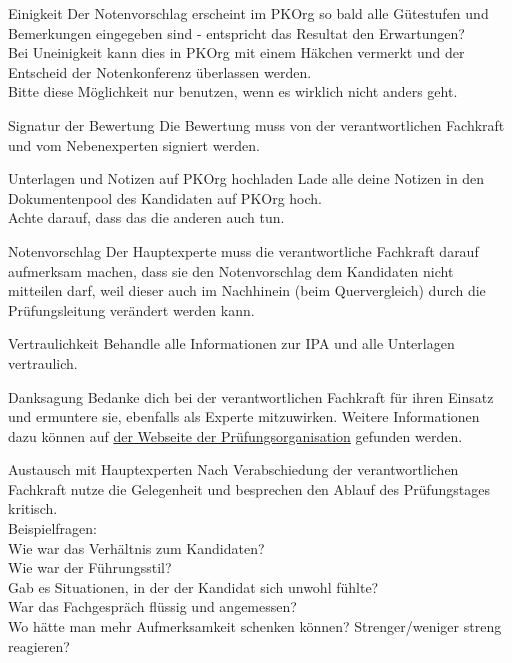 \begin{taskitem}{Einigkeit}
  Der Notenvorschlag erscheint im PKOrg so bald alle Gütestufen und Bemerkungen eingegeben sind - entspricht das Resultat den Erwartungen?\\
  Bei Uneinigkeit kann dies in PKOrg mit einem Häkchen vermerkt und der Entscheid der Notenkonferenz überlassen werden.\\
  Bitte diese Möglichkeit nur benutzen, wenn es wirklich nicht anders geht.
\end{taskitem}
\begin{taskitemwithoutcomment}{Signatur der Bewertung}
  Die Bewertung muss von der verantwortlichen Fachkraft und vom Nebenexperten signiert werden.
\end{taskitemwithoutcomment}
\begin{taskitemwithoutcomment}{Unterlagen und Notizen auf PKOrg hochladen}
  Lade alle deine Notizen in den Dokumentenpool des Kandidaten auf PKOrg hoch.\\
  Achte darauf, dass das die anderen auch tun.
\end{taskitemwithoutcomment}
\begin{taskitemwithoutcomment}{Notenvorschlag}
  Der Hauptexperte muss die verantwortliche Fachkraft darauf aufmerksam machen, dass sie den Notenvorschlag dem Kandidaten nicht mitteilen darf, weil dieser auch im Nachhinein (beim Quervergleich) durch die Prüfungsleitung verändert werden kann.
\end{taskitemwithoutcomment}
\begin{taskitemwithoutcomment}{Vertraulichkeit}
  Behandle alle Informationen zur IPA und alle Unterlagen vertraulich.
\end{taskitemwithoutcomment}
\begin{taskitemwithoutcomment}{Danksagung}
  Bedanke dich bei der verantwortlichen Fachkraft für ihren Einsatz und ermuntere sie, ebenfalls als Experte mitzuwirken. Weitere Informationen dazu können auf \href{https://pk19.ch}{der Webseite der Prüfungsorganisation} gefunden werden.
\end{taskitemwithoutcomment}
\newpage
\begin{taskitem}{Austausch mit Hauptexperten}
  Nach Verabschiedung der verantwortlichen Fachkraft nutze die Gelegenheit und besprechen den Ablauf des Prüfungstages kritisch.\\
  Beispielfragen:\\
  Wie war das Verhältnis zum Kandidaten?\\
  Wie war der Führungsstil?\\
  Gab es Situationen, in der der Kandidat sich unwohl fühlte?\\
  War das Fachgespräch flüssig und angemessen?\\
  Wo hätte man mehr Aufmerksamkeit schenken können? Strenger/weniger streng reagieren?
\end{taskitem}
